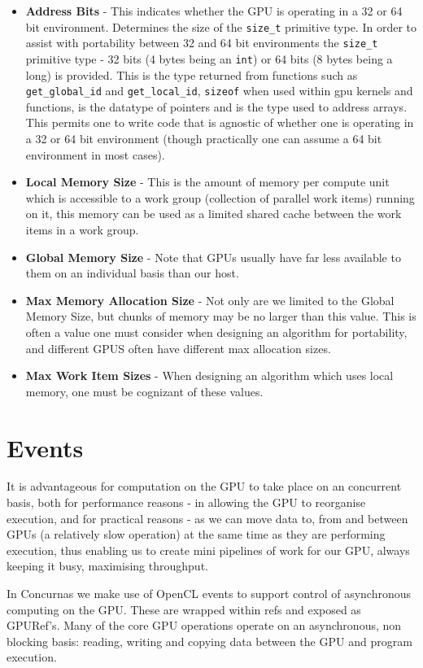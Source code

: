 \documentclass[conc-doc]{subfiles}
\begin{document}
\begin{itemize}
	\item \textbf{Address Bits} - This indicates whether the GPU is operating in a 32 or 64 bit environment. Determines the size of the \lstinline{size_t} primitive type. In order to assist with portability between 32 and 64 bit environments the \lstinline{size_t} primitive type - 32 bits (4 bytes being an \lstinline{int}) or 64 bits (8 bytes being a long) is provided. This is the type returned from functions such as \lstinline{get_global_id} and \lstinline{get_local_id}, \lstinline{sizeof} when used within gpu kernels and functions, is the datatype of pointers and is the type used to address arrays. This permits one to write code that is agnostic of whether one is operating in a 32 or 64 bit environment (though practically one can assume a 64 bit environment in most cases).
	\item \textbf{Local Memory Size} - This is the amount of memory per compute unit which is accessible to a work group (collection of parallel work items) running on it, this memory can be used as a limited shared cache between the work items in a work group.
	\item \textbf{Global Memory Size} - Note that GPUs usually have far less available to them on an individual basis than our host.
	\item \textbf{Max Memory Allocation Size} - Not only are we limited to the Global Memory Size, but chunks of memory may be no larger than this value. This is often a value one must consider when designing an algorithm for portability, and different GPUS often have different max allocation sizes.
	\item \textbf{Max Work Item Sizes} - When designing an algorithm which uses local memory, one must be cognizant of these values.
\end{itemize}

\section{Events}
It is advantageous for computation on the GPU to take place on an concurrent basis, both for performance reasons - in allowing the GPU to reorganise execution, and for practical reasons - as we can move data to, from and between GPUs (a relatively slow operation) at the same time as they are performing execution, thus enabling us to create mini pipelines of work for our GPU, always keeping it busy, maximising throughput.

In Concurnas we make use of OpenCL events to support control of asynchronous computing on the GPU. These are wrapped within refs and exposed as GPURef's. Many of the core GPU operations operate on an asynchronous, non blocking basis: reading, writing and copying data between the GPU and program execution.
\end{document}
